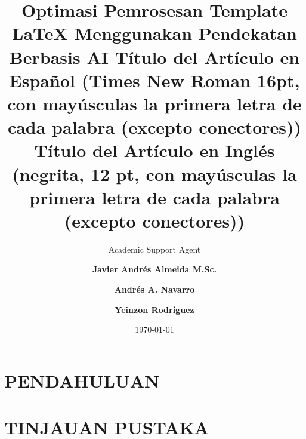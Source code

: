 \documentclass{article}
\title{Optimasi Pemrosesan Template LaTeX Menggunakan Pendekatan Berbasis AI}
\author{Academic Support Agent}
\date{\today}
\begin{document}
\maketitle

\begin{abstract}

\end{abstract}

\chapter{PENDAHULUAN}


\chapter{TINJAUAN PUSTAKA}


\usepackage[letterpaper,left=1.95cm,right=1.95cm,top=2.5cm,bottom=3.16cm]{geometry} %


{\title{\fontsize{16}{16}
\vspace*{-0.7cm}
\textbf{
Título del Artículo en Español (Times New Roman 16pt, con mayúsculas la primera letra de cada palabra (excepto conectores))
} \\[0.2cm]
\fontsize{12}{12}
\textbf{Título del Artículo en Inglés (negrita, 12 pt, con mayúsculas la primera letra de cada palabra (excepto conectores))}\\[0.2cm]}
}

\author[1,*]{\fontsize{10pt}{10pt}\selectfont \textbf{Javier Andrés Almeida M.Sc.}}
\author[2]{\textbf{Andrés A. Navarro}}
\author[1,3]{\textbf{Yeinzon Rodríguez}}


\fontsize{8}{8}



\end{document}

